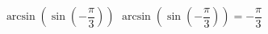  {$\arcsin\left(\sin\left(-\dfrac{\pi}{3}\right) \right)$ }
{ $\arcsin\left(\sin\left(-\dfrac{\pi}{3}\right) \right) = -\dfrac{\pi}{3}$}
